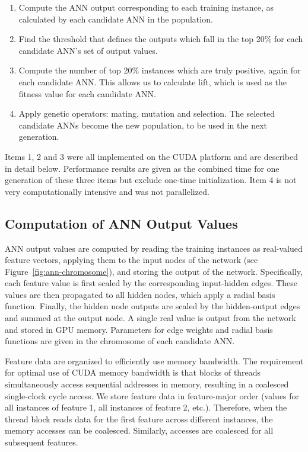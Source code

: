 \documentclass[letterpaper]{jpconf}       %
\begin{document}
\begin{enumerate}
	\item Compute the ANN output corresponding to each training instance, as calculated by each candidate ANN in the population.
	\item Find the threshold that defines the outputs which fall in the top 20\% for each candidate ANN's set of output values.
	\item Compute the number of top 20\% instances which are truly positive, again for each candidate ANN. This allows us to calculate lift, which is used as the fitness value for each candidate ANN.
	\item Apply genetic operators: mating, mutation and selection. The selected candidate ANNs become the new population, to be used in the next generation.
\end{enumerate}

Items 1, 2 and 3 were all implemented on the CUDA platform and are described in detail below. Performance results are given as the combined time for one generation of these three items but exclude one-time initialization. Item 4 is not very computationally intensive and was not parallelized. 

\subsection{Computation of ANN Output Values} \label{ANNcomp}
ANN output values are computed by reading the training instances as real-valued feature vectors, applying them to the input nodes of the network (see Figure~\ref{fig:ann-chromosome}), and storing the output of the network. Specifically, each feature value is first scaled by the corresponding input-hidden edges. These values are then propagated to all hidden nodes, which apply a radial basis function. Finally, the hidden node outputs are scaled by the hidden-output edges and summed at the output node. A single real value is output from the network and stored in GPU memory. Parameters for edge weights and radial basis functions are given in the chromosome of each candidate ANN.

Feature data are organized to efficiently use memory bandwidth. The requirement for optimal use of CUDA memory bandwidth is that blocks of threads simultaneously access sequential addresses in memory, resulting in a coalesced single-clock cycle access. We store feature data in feature-major order (values for all instances of feature 1, all instances of feature 2, etc.). Therefore, when the thread block reads data for the first feature across different instances, the memory accesses can be coalesced. Similarly, accesses are coalesced for all subsequent features.
\end{document}
